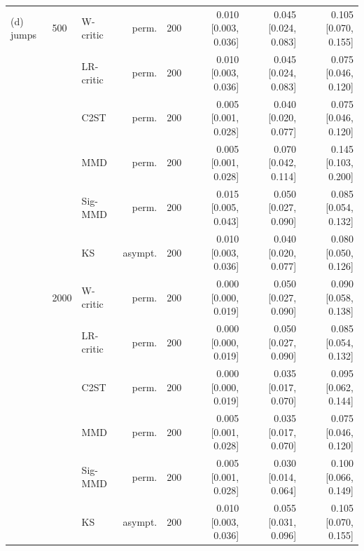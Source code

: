 \begin{tabular}{lllrrrrr}
(d) jumps & 500 & W-critic & perm. & 200 & 0.010 [0.003, 0.036] & 0.045 [0.024, 0.083] & 0.105 [0.070, 0.155] \\
 &  & LR-critic & perm. & 200 & 0.010 [0.003, 0.036] & 0.045 [0.024, 0.083] & 0.075 [0.046, 0.120] \\
 &  & C2ST & perm. & 200 & 0.005 [0.001, 0.028] & 0.040 [0.020, 0.077] & 0.075 [0.046, 0.120] \\
 &  & MMD & perm. & 200 & 0.005 [0.001, 0.028] & 0.070 [0.042, 0.114] & 0.145 [0.103, 0.200] \\
 &  & Sig-MMD & perm. & 200 & 0.015 [0.005, 0.043] & 0.050 [0.027, 0.090] & 0.085 [0.054, 0.132] \\
 &  & KS & asympt. & 200 & 0.010 [0.003, 0.036] & 0.040 [0.020, 0.077] & 0.080 [0.050, 0.126] \\
 & 2000 & W-critic & perm. & 200 & 0.000 [0.000, 0.019] & 0.050 [0.027, 0.090] & 0.090 [0.058, 0.138] \\
 &  & LR-critic & perm. & 200 & 0.000 [0.000, 0.019] & 0.050 [0.027, 0.090] & 0.085 [0.054, 0.132] \\
 &  & C2ST & perm. & 200 & 0.000 [0.000, 0.019] & 0.035 [0.017, 0.070] & 0.095 [0.062, 0.144] \\
 &  & MMD & perm. & 200 & 0.005 [0.001, 0.028] & 0.035 [0.017, 0.070] & 0.075 [0.046, 0.120] \\
 &  & Sig-MMD & perm. & 200 & 0.005 [0.001, 0.028] & 0.030 [0.014, 0.064] & 0.100 [0.066, 0.149] \\
 &  & KS & asympt. & 200 & 0.010 [0.003, 0.036] & 0.055 [0.031, 0.096] & 0.105 [0.070, 0.155] \\
\bottomrule
\end{tabular}
